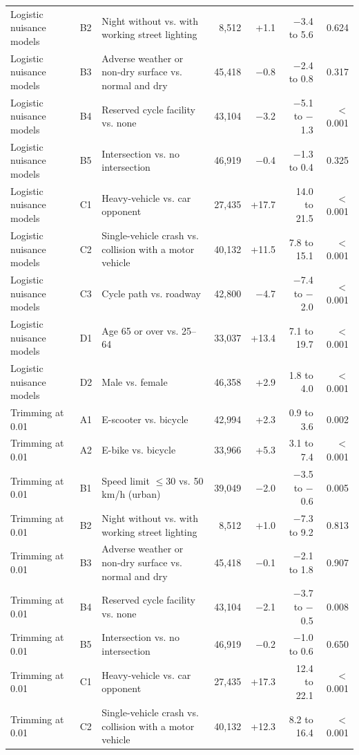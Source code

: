 \begin{table}[tp]
\begin{threeparttable}
{\begin{tabular}{p{4.6cm}lp{4.4cm}rrrr}
Logistic nuisance models & B2 & Night without vs. with working street lighting & 8,512 & +1.1 & $-$3.4 to 5.6 & 0.624 \\
Logistic nuisance models & B3 & Adverse weather or non-dry surface vs. normal and dry & 45,418 & $-$0.8 & $-$2.4 to 0.8 & 0.317 \\
Logistic nuisance models & B4 & Reserved cycle facility vs. none & 43,104 & $-$3.2 & $-$5.1 to $-$1.3 & $<$0.001 \\
Logistic nuisance models & B5 & Intersection vs. no intersection & 46,919 & $-$0.4 & $-$1.3 to 0.4 & 0.325 \\
Logistic nuisance models & C1 & Heavy-vehicle vs. car opponent & 27,435 & +17.7 & 14.0 to 21.5 & $<$0.001 \\
Logistic nuisance models & C2 & Single-vehicle crash vs. collision with a motor vehicle & 40,132 & +11.5 & 7.8 to 15.1 & $<$0.001 \\
Logistic nuisance models & C3 & Cycle path vs. roadway & 42,800 & $-$4.7 & $-$7.4 to $-$2.0 & $<$0.001 \\
Logistic nuisance models & D1 & Age 65 or over vs. 25–64 & 33,037 & +13.4 & 7.1 to 19.7 & $<$0.001 \\
Logistic nuisance models & D2 & Male vs. female & 46,358 & +2.9 & 1.8 to 4.0 & $<$0.001 \\
Trimming at 0.01 & A1 & E-scooter vs. bicycle & 42,994 & +2.3 & 0.9 to 3.6 & 0.002 \\
Trimming at 0.01 & A2 & E-bike vs. bicycle & 33,966 & +5.3 & 3.1 to 7.4 & $<$0.001 \\
Trimming at 0.01 & B1 & Speed limit $\leq$30 vs. 50 km/h (urban) & 39,049 & $-$2.0 & $-$3.5 to $-$0.6 & 0.005 \\
Trimming at 0.01 & B2 & Night without vs. with working street lighting & 8,512 & +1.0 & $-$7.3 to 9.2 & 0.813 \\
Trimming at 0.01 & B3 & Adverse weather or non-dry surface vs. normal and dry & 45,418 & $-$0.1 & $-$2.1 to 1.8 & 0.907 \\
Trimming at 0.01 & B4 & Reserved cycle facility vs. none & 43,104 & $-$2.1 & $-$3.7 to $-$0.5 & 0.008 \\
Trimming at 0.01 & B5 & Intersection vs. no intersection & 46,919 & $-$0.2 & $-$1.0 to 0.6 & 0.650 \\
Trimming at 0.01 & C1 & Heavy-vehicle vs. car opponent & 27,435 & +17.3 & 12.4 to 22.1 & $<$0.001 \\
Trimming at 0.01 & C2 & Single-vehicle crash vs. collision with a motor vehicle & 40,132 & +12.3 & 8.2 to 16.4 & $<$0.001 \\

\end{tabular}}
\end{threeparttable}
\end{table}
